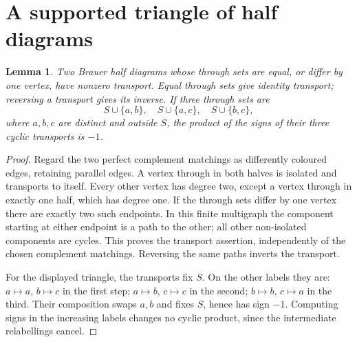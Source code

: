 \documentclass[11pt,a4paper]{article}
\newtheorem{lemma}[theorem]{Lemma}
\begin{document}
\section{A supported triangle of half diagrams}\label{sec:triangles}
\begin{lemma}\label{lem:overlay}
Two Brauer half diagrams whose through sets are equal, or differ by one vertex, have nonzero transport. Equal through sets give identity transport; reversing a transport gives its inverse. If three through sets are
\[
 S\cup\{a,b\},\quad S\cup\{a,c\},\quad S\cup\{b,c\},
\]
where $a,b,c$ are distinct and outside $S$, the product of the signs of their three cyclic transports is $-1$.
\end{lemma}
\begin{proof}
Regard the two perfect complement matchings as differently coloured edges, retaining parallel edges. A vertex through in both halves is isolated and transports to itself. Every other vertex has degree two, except a vertex through in exactly one half, which has degree one. If the through sets differ by one vertex there are exactly two such endpoints. In this finite multigraph the component starting at either endpoint is a path to the other; all other non-isolated components are cycles. This proves the transport assertion, independently of the chosen complement matchings. Reversing the same paths inverts the transport.

For the displayed triangle, the transports fix $S$. On the other labels they are: $a\mapsto a$, $b\mapsto c$ in the first step; $a\mapsto b$, $c\mapsto c$ in the second; $b\mapsto b$, $c\mapsto a$ in the third. Their composition swaps $a,b$ and fixes $S$, hence has sign $-1$. Computing signs in the increasing labels changes no cyclic product, since the intermediate relabellings cancel.
\end{proof}
\end{document}
